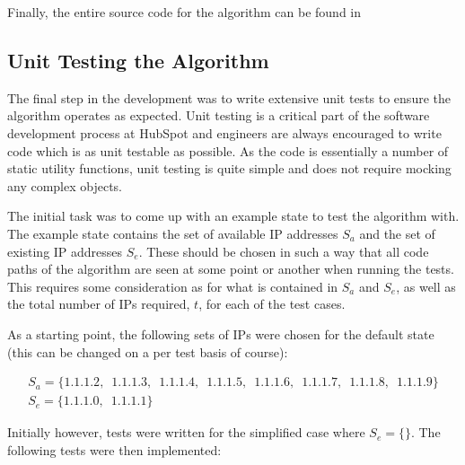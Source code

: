 Finally, the entire source code for the algorithm can be found in 

\break

\subsection{Unit Testing the Algorithm}
The final step in the development was to write extensive unit tests to ensure the algorithm operates as expected. Unit testing is a critical part of the software development process at HubSpot and engineers are always encouraged to write code which is as unit testable as possible. As the code is essentially a number of static utility functions, unit testing is quite simple and does not require mocking any complex objects.  

The initial task was to come up with an example state to test the algorithm with. The example state contains the set of available IP addresses $S_a$ and the set of existing IP addresses $S_e$. These should be chosen in such a way that all code paths of the algorithm are seen at some point or another when running the tests. This requires some consideration as for what is contained in $S_a$ and $S_e$, as well as the total number of IPs required, $t$, for each of the test cases.

As a starting point, the following sets of IPs were chosen for the default state (this can be changed on a per test basis of course):

\begin{equation}\label{eq:initialState}
\begin{gathered}
S_a = \{1.1.1.2,\enspace1.1.1.3,\enspace1.1.1.4,\enspace1.1.1.5,\enspace1.1.1.6,\enspace1.1.1.7,\enspace1.1.1.8,\enspace1.1.1.9\} \\
S_e = \{1.1.1.0,\enspace1.1.1.1\}
\end{gathered}
\end{equation}

Initially however, tests were written for the simplified case where $S_e = \{\}$. The following tests were then implemented:

